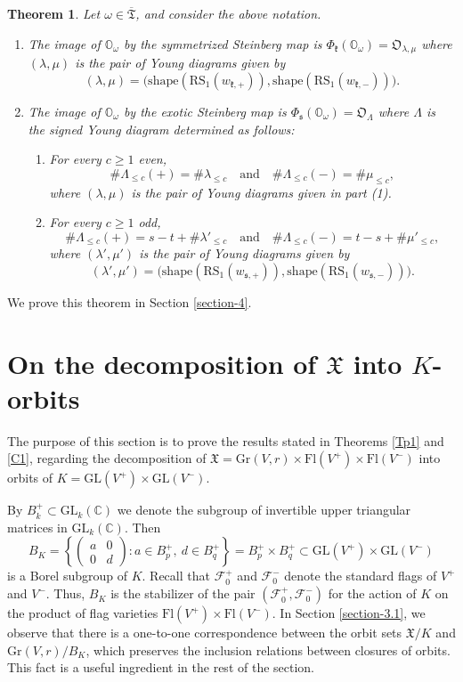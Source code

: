 \documentclass[11pt]{article}
\newtheorem{theorem}[theo]{Theorem}
\theoremstyle{definition}
\numberwithin{equation}{section}
\newcommand{\fk}{\mathfrak{k}}
\newcommand{\fs}{\mathfrak{s}}
\newcommand{\RS}{\mathrm{RS}}
\newcommand{\shape}{\mathrm{shape}}
\newcommand{\nrboxes}[2]{\# #1_{\leq #2}}
\newcommand{\nrplus}[2]{\# #1_{\leq #2}(+)}
\newcommand{\nrminus}[2]{\# #1_{\leq #2}(-)}
\newcommand{\flag}{\mathcal{F}}
\newcommand{\Xorbit}{\mathbb{O}}
\newcommand{\Nkorbit}{\mathfrak{O}}
\newcommand{\Nsorbit}{\mathfrak{O}}
\newcommand{\ppermutationsof}{\mathfrak{T}}
\newcommand{\parameters}{\overline{\ppermutationsof}}
\newcommand{\Xfv}{\mathfrak{X}}
\newcommand{\Grass}{\mathrm{Gr}}
\newcommand{\Flags}{\mathrm{Fl}}
\newcommand{\GL}{\mathrm{GL}}
\newcommand{\mC}{\mathbb{C}}
\begin{document}
\begin{theorem}
\label{T2}
Let $\omega\in\parameters$, and consider the above notation.
\begin{enumerate}[label=(\arabic*)]
\item \label{it2vvt1}
The image of $\Xorbit_\omega$ by the symmetrized Steinberg map is  $\Phi_\fk(\Xorbit_\omega)=\Nkorbit_{\lambda,\mu}$ where $(\lambda,\mu)$ is the pair of Young diagrams given by
\[
(\lambda,\mu)=\big(
\shape(\RS_1(w_{\fk,+})),\shape(\RS_1(w_{\fk,-}))\big).
\]
\item \label{it2vvt2} The image of $\Xorbit_\omega$ by the exotic Steinberg map is $\Phi_\fs(\Xorbit_\omega)=\Nsorbit_\Lambda$ where $\Lambda$ is the signed Young diagram determined as follows:
\begin{enumerate}
\item For every $c\geq 1$ even,
\[
\nrplus{\Lambda}{c}=\nrboxes{\lambda}{c}\quad\mbox{and}\quad \nrminus{\Lambda}{c}=\nrboxes{\mu}{c},
\]
where $(\lambda,\mu)$ is the pair of Young diagrams given in part {\rm (1)}.
\item For every $c\geq 1$ odd,
\[
\nrplus{\Lambda}{c}=s-t+\nrboxes{\lambda'}{c}\quad\mbox{and}\quad \nrminus{\Lambda}{c}=t-s+\nrboxes{\mu'}{c},
\]
where $(\lambda',\mu')$ is the pair of Young diagrams given by
\[(\lambda',\mu')=\big(\shape(\RS_1(w_{\fs,+})),\shape(\RS_1(w_{\fs,-}))\big).\]
\end{enumerate}
\end{enumerate}
\end{theorem}

We prove this theorem in Section \ref{section-4}.
\section{On the decomposition of $\Xfv$ into $K$-orbits}

\label{section-3}

The purpose of this section is to prove the results stated in Theorems \ref{Tp1} and \ref{C1}, regarding the decomposition of $\Xfv=\Grass(V,r)\times\Flags(V^+)\times\Flags(V^-)$ into orbits of $K=\GL(V^+)\times\GL(V^-)$.

By $B_k^+\subset\GL_k(\mC)$ we denote the subgroup of invertible upper triangular matrices in $\GL_k(\mC)$.
Then\[B_K=\left\{\begin{pmatrix}
a & 0\\ 0 & d
\end{pmatrix}:a\in B_p^+,\ d\in B_q^+\right\}=B_p^+\times B_q^+\subset\GL(V^+)\times\GL(V^-)\]
is a Borel subgroup of $K$. Recall that $\flag_0^+$ and $\flag_0^-$ denote the standard flags of $V^+$ and $V^-$. Thus, $B_K$ is the stabilizer of the pair $(\flag_0^+,\flag_0^-)$ for the action of $K$ on the product of flag varieties $\Flags(V^+)\times\Flags(V^-)$.
In Section \ref{section-3.1}, we observe that there is a one-to-one correspondence between the orbit sets $\Xfv/K$ and $\Grass(V,r)/B_K$, which preserves the inclusion relations between closures of orbits. This fact is a useful ingredient in the rest of the section.
\end{document}
